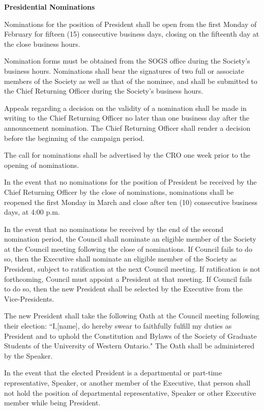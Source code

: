 \begin{longenum}[ label*=\thesection.\arabic*., align=left]
\begin{longenum}[label*=\arabic*., align=left]
 \end{longenum}
 \item \textbf{Presidential Nominations}
 \begin{longenum}[label*=\arabic*., align=left]
  \item  Nominations for the position of President shall be open from the first Monday of February for fifteen (15) consecutive business days, closing on the fifteenth day at the close business hours. 
  \item  Nomination forms must be obtained from the SOGS office during the Society's business hours. Nominations shall bear the signatures of two full or associate members of the Society as well as that of  the nominee, and shall be submitted to the Chief Returning Officer during the Society's business hours.
  \item Appeals regarding a decision on the validity of a nomination shall be made in writing to the Chief Returning Officer no later than one business day after the announcement nomination. The Chief Returning Officer shall render a decision before the beginning of the campaign period.
  \item The call for nominations shall be advertised by the CRO one week prior to the opening of nominations.
  \item In the event that no nominations for the position of President be received by the Chief Returning Officer by the close of nominations, nominations shall be reopened the first Monday in March and close after ten (10) consecutive business days, at 4:00 p.m.
  \item In the event that no nominations be received by the end of the second nomination period, the Council shall nominate an eligible member of the Society at the Council meeting following the close of nominations. If Council fails to do so, then the Executive shall nominate an eligible member of the Society as President, subject to ratification at the next Council meeting. If ratification is not forthcoming, Council must appoint a President at that meeting. If Council fails to do so, then the new President shall be selected by the Executive from the Vice-Presidents.
  \item The new President shall take the following Oath at the Council meeting following their election: ``I,[name], do hereby swear to faithfully fulfill my duties as President and to uphold the Constitution and Bylaws of the Society of Graduate Students of the University of Western Ontario." The Oath shall be administered by the Speaker.
  \item In the event that the elected President is a departmental or part-time representative, Speaker, or another member of the Executive, that person shall not hold the position of departmental representative, Speaker or other Executive member while being President.

\end{longenum}
\end{longenum}
